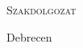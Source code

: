 \vspace*{0.2\paperheight}
{\sffamily
\begin{center}
{\Huge \textsc{Szakdolgozat}}
\end{center}
\vspace{0.3\paperheight}
\begin{flushright}
	\SZERZO
\end{flushright}
\vfill
\begin{center}
	Debrecen\\
	\VEDESEVE
\end{center}
}
